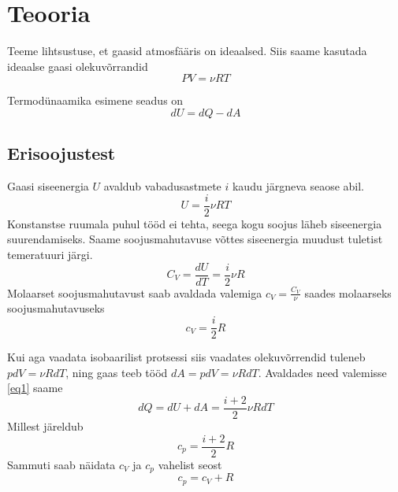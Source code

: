 \documentclass{trkut}%
\begin{document}
\maketitle%
\tableofcontents%

\nummerdame%


\chapter{Teooria}
Teeme lihtsustuse, et gaasid atmosfääris on ideaalsed. Siis saame kasutada ideaalse gaasi olekuvõrrandid
\begin{equation}\label{eq8}
PV=\nu RT
\end{equation}

Termodünaamika esimene seadus on
\begin{equation}\label{eq1}
dU = dQ - dA
\end{equation}

\section{Erisoojustest}
Gaasi siseenergia $U$ avaldub vabadusastmete $i$ kaudu järgneva seaose abil.
\begin{equation}\label{eq5}
U = \frac{i}{2} \nu R T
\end{equation}
Konstanstse ruumala puhul tööd ei tehta, seega kogu soojus läheb siseenergia suurendamiseks. Saame soojusmahutavuse võttes siseenergia muudust tuletist temeratuuri järgi.
\begin{equation}\label{eq6}
C_V = \frac{dU}{dT}=\frac{i}{2}\nu R
\end{equation}
Molaarset soojusmahutavust saab avaldada valemiga $c_V = \frac{C_V}{\nu}$ saades molaarseks soojusmahutavuseks
\begin{equation}\label{eq7}
c_V = \frac{i}{2}R
\end{equation}

Kui aga vaadata isobaarilist protsessi siis vaadates olekuvõrrendid tuleneb $pdV=\nu RdT$, ning gaas teeb tööd $dA = pdV = \nu RdT$. Avaldades need valemisse \ref{eq1} saame
\begin{equation}
dQ = dU + dA = \frac{i+2}{2} \nu R dT
\end{equation}
Millest järeldub
\begin{equation}
c_p=\frac{i+2}{2}R
\end{equation}
Sammuti saab näidata $c_V$ ja $c_p$ vahelist seost
\begin{equation}\label{eq9}
c_p = c_V + R
\end{equation}
          
\end{document}
